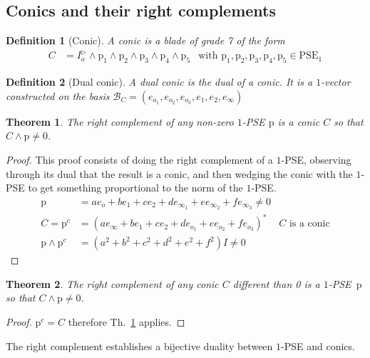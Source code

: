 \documentclass{birkjour}
\newtheorem{theorem}{Theorem}
\newtheorem{definition}{Definition}
\begin{document}
\subsection{Conics and their right complements}
\begin{definition}[Conic]
A conic is a blade of grade 7 of the form
\begin{align}
    C &= I^\triangleright_o \wedge \mathrm{p}_1 \wedge \mathrm{p}_2 \wedge \mathrm{p}_3 \wedge \mathrm{p}_4 \wedge \mathrm{p}_5 & \mbox{with }\mathrm{p}_1, \mathrm{p}_2, \mathrm{p}_3,\mathrm{p}_4,\mathrm{p}_5 \in \mathrm{PSE}_{1}
\end{align}
\end{definition}
\begin{definition}[Dual conic]
    A dual conic is the dual of a conic.
    It is a \(1\)-vector constructed on the basis \(\mathcal{B}_C=(e_{o_1},e_{o_2},e_{o_3},e_{1},e_{2},e_{\infty})\)
\end{definition}
\begin{theorem}\label{th:complement-1-PSE} 
The right complement of any non-zero \(1\)-PSE \(\mathrm{p}\) is a conic \(C\) so that ${C\wedge \mathrm{p} \ne 0}$.
\end{theorem}
\begin{proof}
This proof consists of doing the right complement of a \(1\)-PSE, observing through its dual that the result is a conic, and then wedging the conic with the \(1\)-PSE to get something proportional to the norm of the \(1\)-PSE.
\begin{align*}
\mathrm{p} &=a e_o + b e_1 + c e_2 + d e_{\infty_1} + e e_{\infty_2} + f e_{\infty_3} \neq 0\\
C=\mathrm{p}^c &= \left(a e_\infty + b e_1 + c e_2 + d e_{o_1} + e e_{o_2} + f e_{o_3}\right)^* & C \mbox{ is a conic}\\
\mathrm{p} \wedge \mathrm{p}^c &= \left(a^2 + b^2 +c^2 + d^2 + e^2 + f^2\right) I \ne 0
\end{align*}
\end{proof}


\begin{theorem}
The right complement of any conic \(C\) different than 0 is a \(1\)-PSE~\(\mathrm{p}\) so that ${C\wedge \mathrm{p} \ne 0}$.
\end{theorem}
\begin{proof}
\(\mathrm{p}^c = C\) therefore Th.~\ref{th:complement-1-PSE} applies.
\end{proof}
The right complement establishes a bijective duality between \(1\)-PSE and conics.
\end{document}
